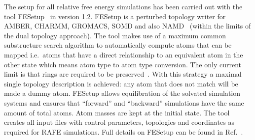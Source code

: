 \documentclass[journal=jctcce,manuscript=article]{achemso}
\begin{document}
The setup for all relative free energy simulations has been carried
out with the tool FESetup~\cite{loeffler_fesetup:_2015} in version
1.2.  FESetup is a perturbed topology writer for AMBER, CHARMM,
GROMACS, SOMD and also NAMD~\cite{JCC:JCC20289} (within the
limits of the dual topology approach).  The tool makes use of a
maximum common substructure search algorithm to automatically compute
atoms that can be mapped i.e.\ atoms that have a direct relationship
to an equivalent atom in the other state which means atom type to
atom type conversion.  The only current limit is that rings are
required to be preserved~\cite{doi:10.1021/acs.jcim.5b00057}.  With this
strategy a maximal single topology description is achieved: any atom that
does not match will be made a dummy atom.  FESetup allows
equilibration of the solvated simulation systems and ensures that
``forward'' and ``backward'' simulations have the same amount of
total atoms.  Atom masses are kept at the initial state.
The tool creates all input files with control
parameters, topologies and coordinates as required for RAFE
simulations.  Full details on FESetup can be found in
Ref.~.
\end{document}
